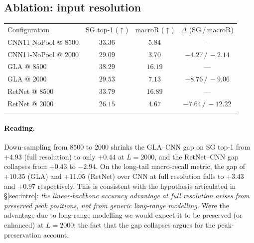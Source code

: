 \documentclass[final]{ws-ijwmip}
\begin{document}
\subsection{Ablation: input resolution}

\begin{table}[!htbp]
{\begin{tabular}{lccc}
\toprule
Configuration & SG top-1 ($\uparrow$) & macroR ($\uparrow$) & $\Delta$ (SG\,/\,macroR) \\
\colrule
CNN11-NoPool @ $8500$ & $33.36$ & $5.84$  & --- \\
CNN11-NoPool @ $2000$ & $29.09$ & $3.70$  & $-4.27\,/\,-2.14$ \\
GLA @ $8500$           & $38.29$ & $16.19$ & --- \\
GLA @ $2000$           & $29.53$ & $7.13$  & $-8.76\,/\,-9.06$ \\
RetNet @ $8500$        & $33.79$ & $16.89$ & --- \\
RetNet @ $2000$        & $26.15$ & $4.67$  & $-7.64\,/\,-12.22$ \\
\botrule
\end{tabular}}
\end{table}

\paragraph{Reading.}
Down-sampling from $8500$ to $2000$ shrinks the GLA--CNN gap on SG top-1
from $+4.93$ (full resolution) to only $+0.44$ at $L=2000$, and the
RetNet--CNN gap collapses from $+0.43$ to $-2.94$. On the long-tail
macro-recall metric, the gap of $+10.35$ (GLA) and $+11.05$ (RetNet)
over CNN at full resolution falls to $+3.43$ and $+0.97$ respectively.
This is consistent with the hypothesis articulated in
\S\ref{sec:intro}: \emph{the linear-backbone accuracy advantage at
full resolution arises from preserved peak positions, not from generic
long-range modelling.} Were the advantage due to long-range modelling
we would expect it to be preserved (or enhanced) at $L=2000$; the fact
that the gap collapses argues for the peak-preservation account.
\end{document}
